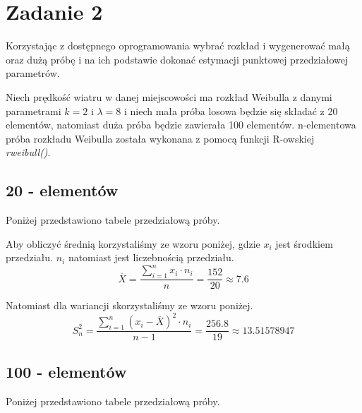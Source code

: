 \documentclass{article}
\begin{document}
\section{Zadanie 2}
Korzystając z dostępnego oprogramowania wybrać rozkład i wygenerować małą oraz dużą próbę i na ich podstawie dokonać estymacji punktowej przedziałowej parametrów. \\ \par

Niech prędkość wiatru w danej miejscowości ma rozkład Weibulla z danymi parametrami $k=2$ i $\lambda = 8$ i niech mała próba losowa będzie się składać z 20 elementów, natomiast duża próba będzie zawierała 100 elementów. n-elementowa próba rozkładu Weibulla została wykonana z pomocą funkcji R-owskiej \textit{rweibull()}.

\subsection{20 - elementów}
Poniżej przedstawiono tabele przedziałową próby.
\begin{center}
\end{center}

Aby obliczyć średnią korzystaliśmy ze wzoru poniżej, gdzie $x_i$ jest środkiem przedziału. $n_i$ natomiast jest liczebnością przedziału.
\[ \overline{X} = \frac{\sum_{i=1}^n x_i \cdot n_i}{n} = \frac{152}{20} \approx 7.6\]

Natomiast dla wariancji skorzystaliśmy ze wzoru poniżej.
\[ S^2_n = \frac{\sum_{i=1}^n(x_i-\overline{X})^2 \cdot n_i}{n-1} = \frac{256.8}{19} \approx 13.51578947 \]

\subsection{100 - elementów}
Poniżej przedstawiono tabele przedziałową próby.
\begin{center}
\end{center}
\end{document}
